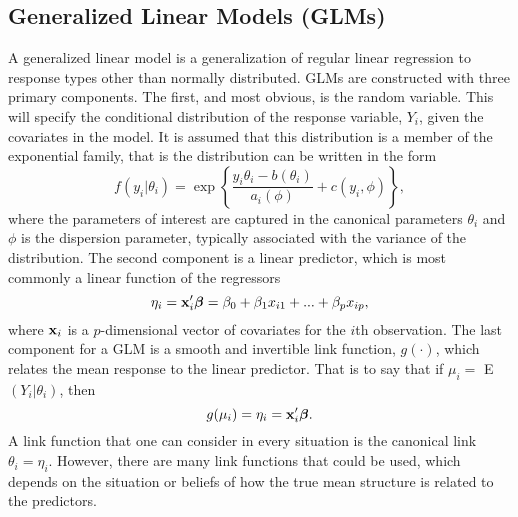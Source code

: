 \documentclass[12pt]{extarticle}
\begin{document}
\subsection{Generalized Linear Models (GLMs)}
\noindent  A generalized linear model is a generalization of regular linear regression to response types other than normally distributed.  GLMs are constructed with three primary components.  The first, and most obvious, is the random variable.  This will specify the conditional distribution of the response variable, $Y_i$, given the covariates in the model.  It is assumed that this distribution is a member of the exponential family, that is the distribution can be written in the form
\[
f(y_i|\theta_i) = \exp\left\{\frac{y_i\theta_i - b(\theta_i)}{a_i(\phi)} + c(y_i,\phi)\right\},
\]
where the parameters of interest are captured in the canonical parameters $\theta_i$ and $\phi$ is the dispersion parameter, typically associated with the variance of the distribution.
The second component is a linear predictor, which is most commonly a linear function of the regressors
\[
\eta_i = {\bf x}'_i\boldsymbol\beta = \beta_0 + \beta_1x_{i1} + ... + \beta_px_{ip},
\]
where ${\bf x}_i$ is a $p$-dimensional vector of covariates for the $i$th observation.  The last component for a GLM is a smooth and invertible link function, $g(\cdot)$, which relates the mean response to the linear predictor.  That is to say that if $\mu_i =$ E$(Y_i|\theta_i)$, then
\[
g(\mu_i) = \eta_i = {\bf x}'_i\boldsymbol\beta.
\]
A link function that one can consider in every situation is the canonical link $\theta_i = \eta_i$.  However, there are many link functions that could be used, which depends on the situation or beliefs of how the true mean structure is related to the predictors.
\end{document}
